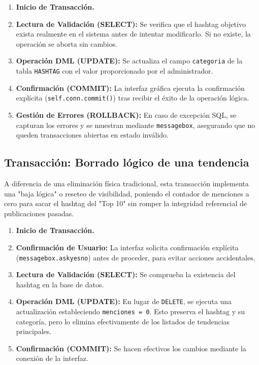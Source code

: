 \begin{enumerate} \item \textbf{Inicio de Transacción.} \item \textbf{Lectura de Validación (SELECT):} Se verifica que el hashtag objetivo exista realmente en el sistema antes de intentar modificarlo. Si no existe, la operación se aborta sin cambios. \item \textbf{Operación DML (UPDATE):} Se actualiza el campo \texttt{categoria} de la tabla \texttt{HASHTAG} con el valor proporcionado por el administrador. \item \textbf{Confirmación (COMMIT):} La interfaz gráfica ejecuta la confirmación explícita (\texttt{self.conn.commit()}) tras recibir el éxito de la operación lógica. \item \textbf{Gestión de Errores (ROLLBACK):} En caso de excepción SQL, se capturan los errores y se muestran mediante \texttt{messagebox}, asegurando que no queden transacciones abiertas en estado inválido. \end{enumerate}

\subsection{Transacción: Borrado lógico de una tendencia} A diferencia de una eliminación física tradicional, esta transacción implementa una "baja lógica" o reseteo de visibilidad, poniendo el contador de menciones a cero para sacar el hashtag del "Top 10" sin romper la integridad referencial de publicaciones pasadas.

\begin{enumerate} \item \textbf{Inicio de Transacción.} \item \textbf{Confirmación de Usuario:} La interfaz solicita confirmación explícita (\texttt{messagebox.askyesno}) antes de proceder, para evitar acciones accidentales. \item \textbf{Lectura de Validación (SELECT):} Se comprueba la existencia del hashtag en la base de datos. \item \textbf{Operación DML (UPDATE):} En lugar de \texttt{DELETE}, se ejecuta una actualización estableciendo \texttt{menciones = 0}. Esto preserva el hashtag y su categoría, pero lo elimina efectivamente de los listados de tendencias principales. \item \textbf{Confirmación (COMMIT):} Se hacen efectivos los cambios mediante la conexión de la interfaz. \end{enumerate}

